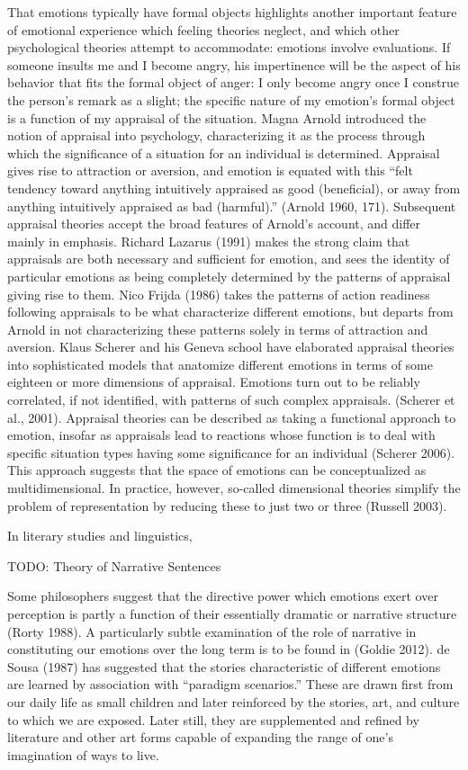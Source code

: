 That emotions typically have formal objects highlights another
important feature of emotional experience which feeling theories
neglect, and which other psychological theories attempt to
accommodate: emotions involve evaluations. If someone insults me and I
become angry, his impertinence will be the aspect of his behavior that
fits the formal object of anger: I only become angry once I construe
the person's remark as a slight; the specific nature of my emotion's
formal object is a function of my appraisal of the situation. Magna
Arnold introduced the notion of appraisal into psychology,
characterizing it as the process through which the significance of a
situation for an individual is determined. Appraisal gives rise to
attraction or aversion, and emotion is equated with this ``felt
tendency toward anything intuitively appraised as good (beneficial),
or away from anything intuitively appraised as bad (harmful).''
(Arnold 1960, 171). Subsequent appraisal theories accept the broad
features of Arnold's account, and differ mainly in emphasis. Richard
Lazarus (1991) makes the strong claim that appraisals are both
necessary and sufficient for emotion, and sees the identity of
particular emotions as being completely determined by the patterns of
appraisal giving rise to them. Nico Frijda (1986) takes the patterns
of action readiness following appraisals to be what characterize
different emotions, but departs from Arnold in not characterizing
these patterns solely in terms of attraction and aversion. Klaus
Scherer and his Geneva school have elaborated appraisal theories into
sophisticated models that anatomize different emotions in terms of
some eighteen or more dimensions of appraisal. Emotions turn out to be
reliably correlated, if not identified, with patterns of such complex
appraisals. (Scherer et al., 2001). Appraisal theories can be
described as taking a functional approach to emotion, insofar as
appraisals lead to reactions whose function is to deal with specific
situation types having some significance for an individual (Scherer
2006). This approach suggests that the space of emotions can be
conceptualized as multidimensional. In practice, however, so-called
dimensional theories simplify the problem of representation by
reducing these to just two or three (Russell 2003).

In literary studies and linguistics,

TODO: Theory of Narrative Sentences

Some philosophers suggest that the directive power which emotions
exert over perception is partly a function of their essentially
dramatic or narrative structure (Rorty 1988). A particularly subtle
examination of the role of narrative in constituting our emotions over
the long term is to be found in (Goldie 2012).  de Sousa (1987) has
suggested that the stories characteristic of different emotions are
learned by association with ``paradigm scenarios.'' These are drawn
first from our daily life as small children and later reinforced by
the stories, art, and culture to which we are exposed. Later still,
they are supplemented and refined by literature and other art forms
capable of expanding the range of one's imagination of ways to live.

